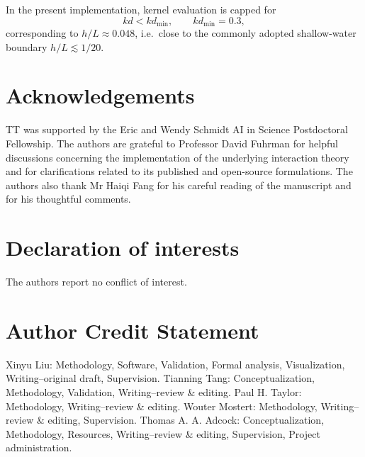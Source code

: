 \documentclass[lineno]{JFM-FLM_Au}
\begin{document}
\begin{appen}
In the present implementation, kernel evaluation is capped for
\[
kd < kd_{\min},
\qquad
kd_{\min}=0.3,
\]
corresponding to $h/L \approx 0.048$, i.e.\ close to the commonly adopted shallow-water boundary
$h/L\lesssim 1/20$.
\end{appen}

\section*{Acknowledgements}
TT was supported by the Eric and Wendy Schmidt AI in Science Postdoctoral Fellowship. %
The authors are grateful to Professor David Fuhrman for helpful discussions concerning the implementation of the underlying interaction theory and for clarifications related to its published and open-source formulations. The authors also thank Mr Haiqi Fang for his careful reading of the manuscript and for his thoughtful comments.
 

\section*{Declaration of interests} 
%
The authors report no conflict of interest.

\section*{Author Credit Statement}
Xinyu Liu: Methodology, Software, Validation, Formal analysis, Visualization, Writing--original draft, Supervision. 
Tianning Tang: Conceptualization, Methodology, Validation, Writing--review \& editing. 
Paul H. Taylor: Methodology, Writing--review \& editing. 
Wouter Mostert: Methodology, Writing--review \& editing, Supervision. 
Thomas A. A. Adcock: Conceptualization, Methodology, Resources, Writing--review \& editing, Supervision, Project administration.

\clearpage


\end{document}
